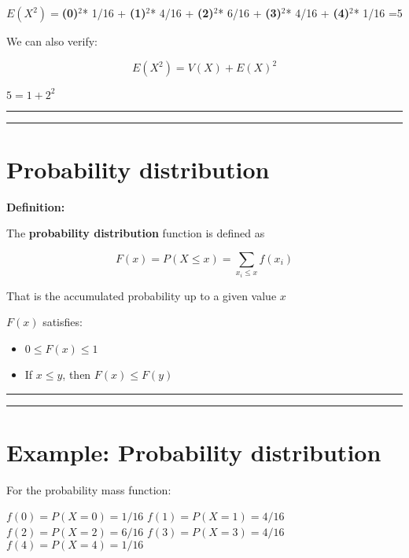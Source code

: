 \documentclass[
]{book}
\providecommand{\tightlist}{%
  \setlength{\itemsep}{0pt}\setlength{\parskip}{0pt}}
\begin{document}
\(E(X^2)=\)\textbf{(0)}\(^2\)* 1/16 + \textbf{(1)}\(^2\)* 4/16 + \textbf{(2)}\(^2\)* 6/16 + \textbf{(3)}\(^2\)* 4/16 + \textbf{(4)}\(^2\)* 1/16 =5

We can also verify:

\[E(X^2)=V(X)+E(X)^2\]

\(5=1+2^2\)

\begin{center}\rule{0.5\linewidth}{0.5pt}\end{center}

\begin{center}\rule{0.5\linewidth}{0.5pt}\end{center}

\hypertarget{probability-distribution}{%
\section{Probability distribution}\label{probability-distribution}}

\textbf{Definition:}

The \textbf{probability distribution} function is defined as

\[F(x)=P(X\leq x)=\sum_{x_i\leq x} f(x_i) \]

That is the accumulated probability up to a given value \(x\)

\(F(x)\) satisfies:

\begin{itemize}
\tightlist
\item
  \(0\leq F(x) \leq 1\)
\item
  If \(x \leq y\), then \(F(x) \leq F(y)\)
\end{itemize}

\begin{center}\rule{0.5\linewidth}{0.5pt}\end{center}

\begin{center}\rule{0.5\linewidth}{0.5pt}\end{center}

\hypertarget{example-probability-distribution}{%
\section{Example: Probability distribution}\label{example-probability-distribution}}

For the probability mass function:

\(f(0)=P(X=0)=1/16\)
\(f(1)=P(X=1)=4/16\)
\(f(2)=P(X=2)=6/16\)
\(f(3)=P(X=3)=4/16\)
\(f(4)=P(X=4)=1/16\)
\end{document}

